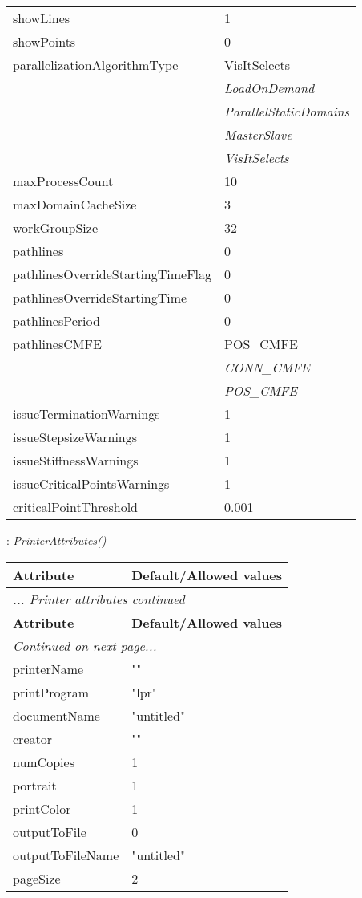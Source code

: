 \documentclass[10pt,a4paper]{report}
\begin{document}
\begin{longtable}{ll}
showLines  &  1 \\
showPoints  &  0 \\
parallelizationAlgorithmType  &  VisItSelects   \\
 & {\it  LoadOnDemand} \\
 & {\it  ParallelStaticDomains} \\
 & {\it  MasterSlave} \\
 & {\it  VisItSelects} \\
maxProcessCount  &  10 \\
maxDomainCacheSize  &  3 \\
workGroupSize  &  32 \\
pathlines  &  0 \\
pathlinesOverrideStartingTimeFlag  &  0 \\
pathlinesOverrideStartingTime  &  0 \\
pathlinesPeriod  &  0 \\
pathlinesCMFE  &  POS\_CMFE   \\
 & {\it  CONN\_CMFE} \\
 & {\it  POS\_CMFE} \\
issueTerminationWarnings  &  1 \\
issueStepsizeWarnings  &  1 \\
issueStiffnessWarnings  &  1 \\
issueCriticalPointsWarnings  &  1 \\
criticalPointThreshold  &  0.001 \\
\end{longtable}

\newpage

{}
: {\it PrinterAttributes() }\\[-3mm]

\begin{longtable}{ll}
{\bf Attribute} & {\bf Default/Allowed values} \\
\hline \hline
\endfirsthead
\multicolumn{2}{l}{{\it ... Printer attributes continued}} \\
{\bf Attribute} & {\bf Default/Allowed values} \\
\hline \hline
\endhead
\hline
\multicolumn{2}{l}{{\it Continued on next page...}} \\
\endfoot
\hline
\endlastfoot

printerName  &  "" \\
printProgram  &  "lpr" \\
documentName  &  "untitled" \\
creator  &  "" \\
numCopies  &  1 \\
portrait  &  1 \\
printColor  &  1 \\
outputToFile  &  0 \\
outputToFileName  &  "untitled" \\
pageSize  &  2 \\
\end{longtable}
\end{document}
